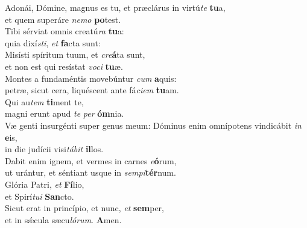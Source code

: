 \evenverse Adonái, Dómine, magnus es tu, et præclárus in virtú\textit{te} \textbf{tu}a,~\*\\
\evenverse et quem superáre \textit{ne}\textit{mo} \textbf{po}test.\\
\oddverse Tibi sérviat omnis creatú\textit{ra} \textbf{tu}a:~\*\\
\oddverse quia dixí\textit{sti}, \textit{et} \textbf{fa}cta sunt:\\
\evenverse Misísti spíritum tuum, et \textit{cre}\textbf{á}ta sunt,~\*\\
\evenverse et non est qui resístat \textit{vo}\textit{ci} \textbf{tu}æ.\\
\oddverse Montes a fundaméntis movebúntur \textit{cum} \textbf{a}quis:~\*\\
\oddverse petræ, sicut cera, liquéscent ante fá\textit{ci}\textit{em} \textbf{tu}am.\\
\evenverse Qui au\textit{tem} \textbf{ti}ment te,~\*\\
\evenverse magni erunt apud \textit{te} \textit{per} \textbf{óm}nia.\\
\oddverse Væ genti insurgénti super genus meum: Dóminus enim omnípotens vindicábit \textit{in} \textbf{e}is,~\*\\
\oddverse in die judícii visi\textit{tá}\textit{bit} \textbf{il}los.\\
\evenverse Dabit enim ignem, et vermes in carnes \textit{e}\textbf{ó}rum,~\*\\
\evenverse ut urántur, et séntiant usque in \textit{sem}\textit{pi}\textbf{tér}num.\\
\oddverse Glória Patri, \textit{et} \textbf{Fí}lio,~\*\\
\oddverse et Spirí\textit{tu}\textit{i} \textbf{San}cto.\\
\evenverse Sicut erat in princípio, et nunc, \textit{et} \textbf{sem}per,~\*\\
\evenverse et in sǽcula sæcu\textit{ló}\textit{rum}. \textbf{A}men.\\
